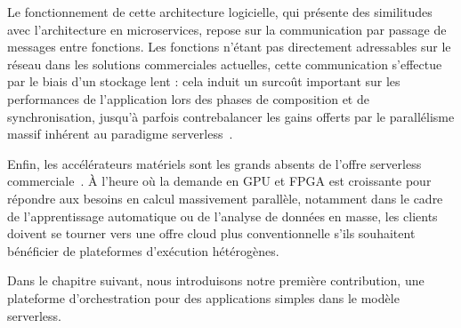 Le fonctionnement de cette architecture logicielle, qui présente des similitudes avec l'architecture en microservices, repose sur la communication par passage de messages entre fonctions. Les fonctions n'étant pas directement adressables sur le réseau dans les solutions commerciales actuelles, cette communication s'effectue par le biais d'un stockage lent : cela induit un surcoût important sur les performances de l'application lors des phases de composition et de synchronisation, jusqu'à parfois contrebalancer les gains offerts par le parallélisme massif inhérent au paradigme serverless~\cite{mullerLambadaInteractiveData2020}.

Enfin, les accélérateurs matériels sont les grands absents de l'offre serverless commerciale~\cite{khandelwalTaureauDeconstructingServerless2020}. À l'heure où la demande en \gls{GPU} et \gls{FPGA} est croissante pour répondre aux besoins en calcul massivement parallèle, notamment dans le cadre de l'apprentissage automatique ou de l'analyse de données en masse, les clients doivent se tourner vers une offre cloud plus conventionnelle s'ils souhaitent bénéficier de plateformes d'exécution hétérogènes.

Dans le chapitre suivant, nous introduisons notre première contribution, une plateforme d'orchestration pour des applications simples dans le modèle serverless.
